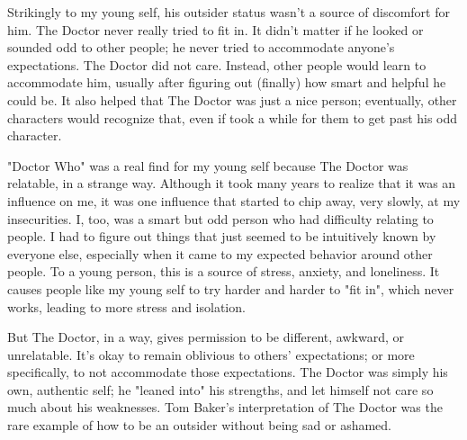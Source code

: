 \documentclass[
a4paper, %
11pt, %
onecolumn, %
openany, %
]{memoir}
\begin{document}
Strikingly to my young self, his outsider status wasn't a source of discomfort for him. The Doctor never really tried to fit in. It didn't matter if he looked or sounded odd to other people; he never tried to accommodate anyone's expectations. The Doctor did not care. Instead, other people would learn to accommodate him, usually after figuring out (finally) how smart and helpful he could be. It also helped that The Doctor was just a nice person; eventually, other characters would recognize that, even if took a while for them to get past his odd character.

"Doctor Who" was a real find for my young self because The Doctor was relatable, in a strange way. Although it took many years to realize that it was an influence on me, it was one influence that started to chip away, very slowly, at my insecurities. I, too, was a smart but odd person who had difficulty relating to people. I had to figure out things that just seemed to be intuitively known by everyone else, especially when it came to my expected behavior around other people. To a young person, this is a source of stress, anxiety, and loneliness. It causes people like my young self to try harder and harder to "fit in", which never works, leading to more stress and isolation.

But The Doctor, in a way, gives permission to be different, awkward, or unrelatable. It's okay to remain oblivious to others' expectations; or more specifically, to not accommodate those expectations. The Doctor was simply his own, authentic self; he "leaned into" his strengths, and let himself not care so much about his weaknesses. Tom Baker's interpretation of The Doctor was the rare example of how to be an outsider without being sad or ashamed.






\backmatter


% 
% 
\end{document}
